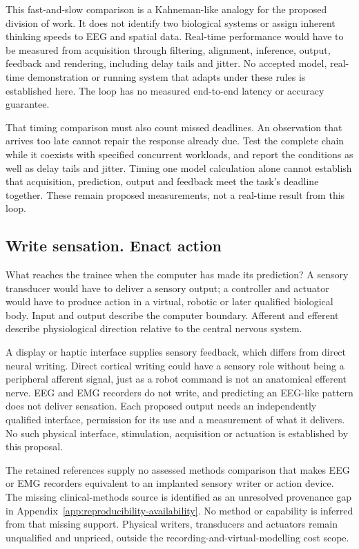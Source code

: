 This fast-and-slow comparison is a Kahneman-like analogy for the proposed division of work. It does not identify two biological systems or assign inherent thinking speeds to EEG and spatial data. Real-time performance would have to be measured from acquisition through filtering, alignment, inference, output, feedback and rendering, including delay tails and jitter. No accepted model, real-time demonstration or running system that adapts under these rules is established here. The loop has no measured end-to-end latency or accuracy guarantee.

That timing comparison must also count missed deadlines. An observation that
arrives too late cannot repair the response already due. Test the complete
chain while it coexists with specified concurrent workloads, and report the
conditions as well as delay tails and jitter. Timing one model calculation
alone cannot establish that acquisition, prediction, output and feedback meet
the task's deadline together. These remain proposed measurements, not a
real-time result from this loop.

\subsection{Write sensation. Enact action}
What reaches the trainee when the computer has made its prediction? A sensory
transducer would have to deliver a sensory output; a controller and actuator
would have to produce action in a virtual, robotic or later qualified biological
body. Input and output describe the computer boundary. Afferent and efferent
describe physiological direction relative to the central nervous system.

A display or haptic interface supplies sensory feedback, which differs from direct neural writing. Direct cortical writing could have a sensory role without being a peripheral afferent signal, just as a robot command is not an anatomical efferent nerve. EEG and EMG recorders do not write, and predicting an EEG-like pattern does not deliver sensation. Each proposed output needs an independently qualified interface, permission for its use and a measurement of what it delivers. No such physical interface, stimulation, acquisition or actuation is established by this proposal.

The retained references supply no assessed methods comparison that makes EEG or EMG recorders equivalent to an implanted sensory writer or action device. The missing clinical-methods source is identified as an unresolved provenance gap in Appendix~\ref{app:reproducibility-availability}. No method or capability is inferred from that missing support. Physical writers, transducers and actuators remain unqualified and unpriced, outside the recording-and-virtual-modelling cost scope.

